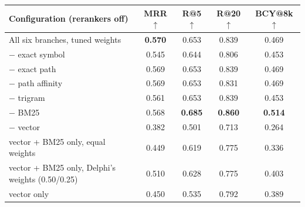\begin{tabular}{lcccc}
\toprule
Configuration (rerankers off) & MRR $\uparrow$ & R@5 $\uparrow$ & R@20 $\uparrow$ & BCY@8k $\uparrow$ \\
\midrule
All six branches, tuned weights & \textbf{0.570} & 0.653 & 0.839 & 0.469 \\
$-$ exact symbol & 0.545 & 0.644 & 0.806 & 0.453 \\
$-$ exact path & 0.569 & 0.653 & 0.839 & 0.469 \\
$-$ path affinity & 0.569 & 0.653 & 0.831 & 0.469 \\
$-$ trigram & 0.561 & 0.653 & 0.839 & 0.453 \\
$-$ BM25 & 0.568 & \textbf{0.685} & \textbf{0.860} & \textbf{0.514} \\
$-$ vector & 0.382 & 0.501 & 0.713 & 0.264 \\
vector + BM25 only, equal weights & 0.449 & 0.619 & 0.775 & 0.336 \\
vector + BM25 only, Delphi's weights (0.50/0.25) & 0.510 & 0.628 & 0.775 & 0.403 \\
vector only & 0.450 & 0.535 & 0.792 & 0.389 \\
\bottomrule
\end{tabular}%